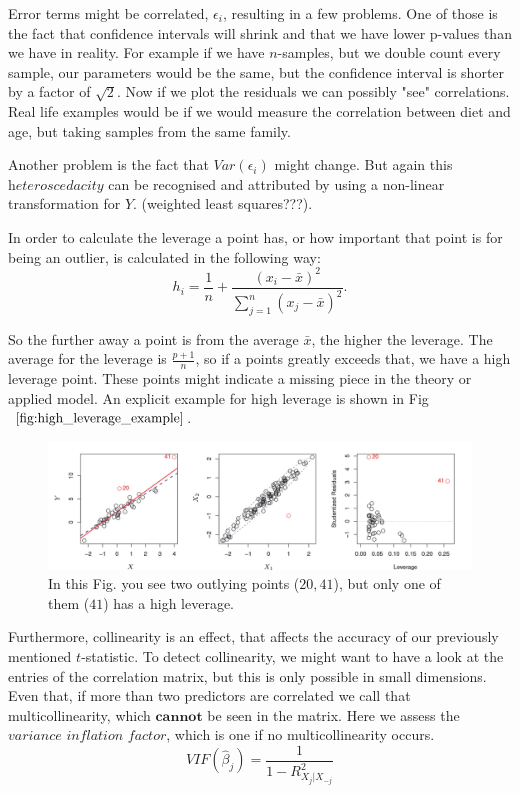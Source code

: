 \documentclass{article}
\begin{document}
Error terms might be correlated, $\epsilon_i$, resulting in a few problems. One of those is the fact that confidence intervals will shrink and that we have lower p-values than we have in reality. For example if we have $n$-samples, but we double count every sample, our parameters would be the same, but the confidence interval is shorter by a factor of $\sqrt{2}$.
Now if we plot the residuals we can possibly "see" correlations. Real life examples would be if we would measure the correlation between diet and age, but taking samples from the same family.

Another problem is the fact that $Var(\epsilon_i)$ might change. But again this $\textit{heteroscedacity}$ can be recognised and attributed by using a non-linear transformation for $Y$. (weighted least squares???).

In order to calculate the leverage a point has, or how important that point is for being an outlier, is calculated in the following way:
\begin{equation}
  \label{eq:leverage}
  h_i = \frac{1}{n} + \frac{(x_i-\bar x)^2}{\sum_{j=1}^n (x_j-\bar x)^2}.
\end{equation}

So the further away a point is from the average $\bar x$, the higher the leverage. The average for the leverage is $\frac{p+1}{n}$, so if a points greatly exceeds that, we have a high leverage point. These points might indicate a missing piece in the theory or applied model. An explicit example for high leverage is shown in Fig$~\ref{fig:high_leverage_example}$.

\begin{figure}[ht]
    \centering
    \includegraphics[width=\textwidth]{high_leverage.png}
    \caption{In this Fig. you see two outlying points ($20,41$), but only one of them ($41$) has a high leverage.}
    \label{fig:high_leverage_example}
\end{figure}

Furthermore, collinearity is an effect, that affects the accuracy of our previously mentioned $t$-statistic. To detect collinearity, we might want to have a look at the entries of the correlation matrix, but this is only possible in small dimensions. Even that, if more than two predictors are correlated we call that multicollinearity, which $\mathbf{cannot}$ be seen in the matrix. Here we assess the $\textit{variance inflation factor}$, which is one if no multicollinearity occurs. 
$$VIF(\hat \beta_j) = \frac{1}{1-R^2_{X_j|X_{-j}}}$$
\end{document}
